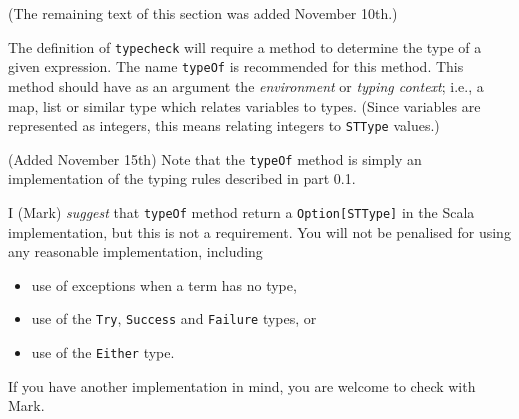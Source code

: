 \documentclass[11pt]{article}
\theoremstyle{definition}
\begin{document}
(The remaining text of this section was added November 10th.)

The definition of \texttt{typecheck} will require a method to determine
the type of a given expression.
The name \texttt{typeOf} is recommended for this method.
This method should have as an argument the \emph{environment} or \emph{typing context};
i.e., a map, list or similar type which relates variables to types. 
(Since variables are represented as integers,
this means relating integers to \texttt{STType} values.)

(Added November 15th) Note that the \texttt{typeOf} method is simply an implementation
of the typing rules described in part 0.1.

I (Mark) \emph{suggest} that \texttt{typeOf} method return a \texttt{Option[STType]} in the Scala implementation,
but this is not a requirement.
You will not be penalised for using any reasonable implementation,
including
\begin{itemize}
\item use of exceptions when a term has no type,
\item use of the \texttt{Try}, \texttt{Success} and \texttt{Failure} types, or
\item use of the \texttt{Either} type.
\end{itemize}
If you have another implementation in mind, you are welcome to check
with Mark.
\end{document}
